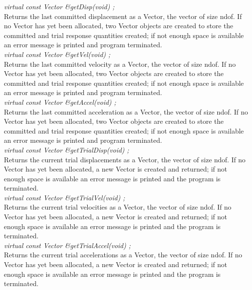 {\em  virtual const Vector \&getDisp(void) ;}  \\
Returns the last committed displacement as a Vector, the vector of
size \p ndof. If no Vector has yet been allocated, two Vector
objects are created to store the committed and trial response
quantities created; if not enough space is available an error message
is printed and program terminated. \\ 

{\em  virtual const Vector \&getVel(void) ;}  \\
Returns the last committed velocity as a Vector, the vector of size
\p ndof. If no Vector has yet been allocated, two Vector
objects are created to store the committed and trial response
quantities created; if not enough space is available an error message
is printed and program terminated. \\ 


{\em  virtual const Vector \&getAccel(void) ;}  \\
Returns the last committed acceleration as a Vector, the vector of
size \p ndof. If no Vector has yet been allocated, two Vector 
objects are created to store the committed and trial response
quantities created; if not enough space is available an error message
is printed and program terminated. \\ 

{\em  virtual const Vector \&getTrialDisp(void) ;}  \\
Returns the current trial displacements as a Vector, the vector of size \p ndof.
If no Vector has yet been allocated, a new Vector is created and returned;
if not enough space is available an error message is printed and the
program is terminated. \\ 


{\em  virtual const Vector \&getTrialVel(void) ;}  \\
Returns the current trial velocities as a Vector, the vector of size \p ndof.
If no Vector has yet been allocated, a new Vector is created and returned;
if not enough space is available an error message is printed and the
program is terminated. \\ 

{\em  virtual const Vector \&getTrialAccel(void) ;}  \\
Returns the current trial accelerations as a Vector, the vector of size \p ndof.
If no Vector has yet been allocated, a new Vector is created and returned;
if not enough space is available an error message is printed and the
program is terminated. \\ 



